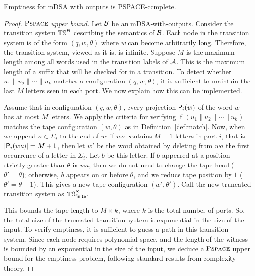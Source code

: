 
\begin{theorem}\label{thm:complexity}
Emptiness for mDSA with outputs is PSPACE-complete.
\end{theorem}
\begin{proof}
    \emph{$\operatorname{\textsc{Pspace}}$ upper bound.} Let $\mathcal{B}$ be an mDSA-with-outputs. Consider the transition system $\mathbb{TS}^{\mathcal{B}}$ describing the semantics of $\mathcal{B}$. Each node in the transition system is of the form $(q, w, \theta)$ where $w$ can become arbitrarily long. Therefore, the transition system, viewed as it is, is infinite. Suppose $M$ is the maximum length among all words used in the transition labels of $\mathcal{A}$. This is the maximum length of a suffix that will be checked for in a transition. To detect whether $u_1 \parallel u_2 \parallel \cdots \parallel u_k$ matches a configuration $(q, w, \theta)$, it is sufficient to maintain the last $M$ letters seen in each port. We now explain how this can be implemented.
    
    Assume that in configuration $(q, w, \theta)$, every projection $\mathsf{P}_{i}(w)$ of the word $w$ has at most $M$ letters. We apply the criteria for verifying if $(u_1 \parallel u_2 \parallel \cdots \parallel u_k)$ matches the tape configuration $(w, \theta)$ as in Definition~\ref{def:match}. Now, when we append $a \in \Sigma_i$ to the end of $w$: if $wa$ contains $M+1$ letters in port $i$, that is $|\mathsf{P}_{i}(wa)| = M+1$, then let $w'$ be the word obtained by deleting from $wa$ the first occurrence of a letter in $\Sigma_i$. Let $b$ be this letter. If $b$ appeared at a position strictly greater than $\theta$ in $wa$, then we do not need to change the tape head ($\theta' = \theta$); otherwise, $b$ appears on or before $\theta$, and we reduce tape position by $1$ ($\theta' = \theta - 1$). This gives a new tape configuration $(w', \theta')$. Call the new truncated transition system as $\mathbb{TS}_{\mathsf{finite}}^{\mathcal{B}}$.
    
    
    This bounds the tape length to $M \times k$, where $k$ is the total number of ports. So, the total size of the truncated transition system is exponential in the size of the input. To verify emptiness, it is sufficient to guess a path in this transition system. Since each node requires polynomial space, and the length of the witness is bounded by an exponential in the size of the input, we deduce a $\operatorname{\textsc{Pspace}}$ upper bound for the emptiness problem, following standard results from complexity theory.


\end{proof}
